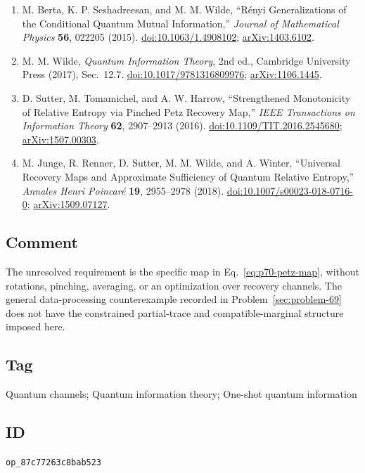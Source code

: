 \begin{enumerate}[label={},leftmargin=4.8em,labelsep=0.5em]
  \footnotesize
  \item[\textup{[BSW15]}]\label{ref:p70-berta-seshadreesan-wilde}
  M. Berta, K. P. Seshadreesan, and M. M. Wilde,
  ``R\'enyi Generalizations of the Conditional Quantum Mutual Information,''
  \emph{Journal of Mathematical Physics} \textbf{56}, 022205 (2015).
  \href{https://doi.org/10.1063/1.4908102}{doi:10.1063/1.4908102};
  \href{https://arxiv.org/abs/1403.6102}{arXiv:1403.6102}.

  \item[\textup{[Wil17]}]\label{ref:p70-wilde}
  M. M. Wilde, \emph{Quantum Information Theory}, 2nd ed., Cambridge
  University Press (2017), Sec.~12.7.
  \href{https://doi.org/10.1017/9781316809976}%
       {doi:10.1017/9781316809976};
  \href{https://arxiv.org/abs/1106.1445}{arXiv:1106.1445}.

  \item[\textup{[STH16]}]\label{ref:p70-sutter-tomamichel-harrow}
  D. Sutter, M. Tomamichel, and A. W. Harrow,
  ``Strengthened Monotonicity of Relative Entropy via Pinched Petz Recovery
  Map,'' \emph{IEEE Transactions on Information Theory} \textbf{62},
  2907--2913 (2016).
  \href{https://doi.org/10.1109/TIT.2016.2545680}%
       {doi:10.1109/TIT.2016.2545680};
  \href{https://arxiv.org/abs/1507.00303}{arXiv:1507.00303}.

  \item[\textup{[JRS+18]}]\label{ref:p70-junge-et-al}
  M. Junge, R. Renner, D. Sutter, M. M. Wilde, and A. Winter,
  ``Universal Recovery Maps and Approximate Sufficiency of Quantum Relative
  Entropy,'' \emph{Annales Henri Poincar\'e} \textbf{19}, 2955--2978 (2018).
  \href{https://doi.org/10.1007/s00023-018-0716-0}%
       {doi:10.1007/s00023-018-0716-0};
  \href{https://arxiv.org/abs/1509.07127}{arXiv:1509.07127}.
\end{enumerate}

\subsection*{Comment}

The unresolved requirement is the specific map in
Eq.~\eqref{eq:p70-petz-map}, without rotations, pinching, averaging, or an
optimization over recovery channels.  The general data-processing
counterexample recorded in Problem~\ref{sec:problem-69} does not have the constrained
partial-trace and compatible-marginal structure imposed here.

\subsection*{Tag}

Quantum channels; Quantum information theory; One-shot quantum information

\subsection*{ID}

\texttt{op\_87c77263c8bab523}
